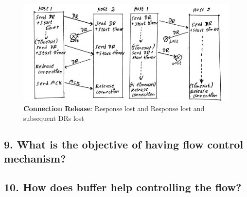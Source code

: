 \documentclass[a4paper,11pt]{article}
\begin{document}
\begin{figure}[H]
	\centering
	\includegraphics[scale=0.14]{figures/img102}
	\caption{\textbf{Connection Release}: Response lost and Response lost and subsequent DRs lost}
\end{figure}

\subsection*{9. What is the objective of having flow control mechanism?}

\subsection*{10. How does buffer help controlling the flow?}
\end{document}
